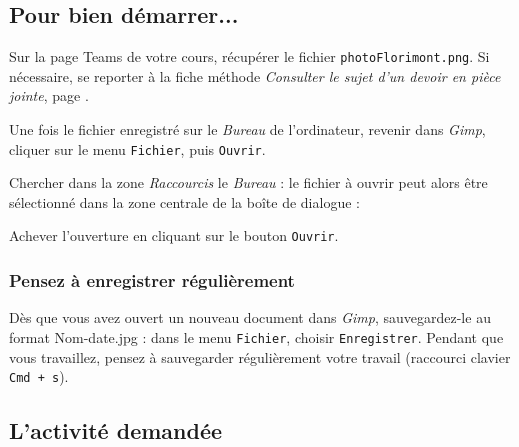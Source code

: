 \subsection{Pour bien démarrer...}

Sur la page Teams de votre cours, récupérer le fichier \texttt{photoFlorimont.png}. Si nécessaire, se reporter à la fiche méthode \emph{Consulter le sujet d'un devoir en pièce jointe}, page \pageref{consulterDevoir}.

Une fois le fichier enregistré sur le \emph{Bureau} de l'ordinateur, revenir dans \emph{Gimp}, cliquer sur le menu \texttt{Fichier}, puis \texttt{Ouvrir}.


Chercher dans la zone \emph{Raccourcis} le \emph{Bureau} : le fichier à ouvrir peut alors être sélectionné dans la zone centrale de la boîte de dialogue :


Achever l'ouverture en cliquant sur le bouton \texttt{Ouvrir}.

\subsubsection{Pensez à enregistrer régulièrement}

Dès que vous avez ouvert un nouveau document dans \emph{Gimp}, sauvegardez-le au format Nom-date.jpg : dans le menu \texttt{Fichier}, choisir \texttt{Enregistrer}. Pendant que vous travaillez, pensez à sauvegarder régulièrement votre travail (raccourci clavier \texttt{Cmd + s}).   




\subsection{L'activité demandée}

\vspace{10pt}


